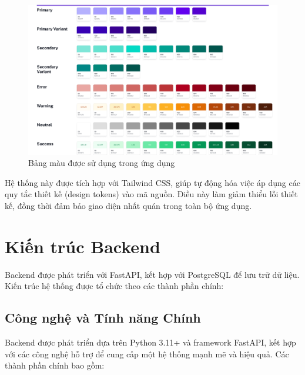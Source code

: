 \begin{figure}[H]
    \centering
    \includegraphics[scale=0.15]{Images/Implement/Colors.jpg}
    \caption{Bảng màu được sử dụng trong ứng dụng}
\end{figure}

Hệ thống này được tích hợp với Tailwind CSS, giúp tự động hóa việc áp dụng các quy tắc thiết kế (design tokens) vào mã nguồn. Điều này làm giảm thiểu lỗi thiết kế, đồng thời đảm bảo giao diện nhất quán trong toàn bộ ứng dụng.

\section{Kiến trúc Backend}

Backend được phát triển với FastAPI, kết hợp với PostgreSQL để lưu trữ dữ liệu. Kiến trúc hệ thống được tổ chức theo các thành phần chính:
\subsection*{Công nghệ và Tính năng Chính}

Backend được phát triển dựa trên Python 3.11+ và framework FastAPI, kết hợp với các công nghệ hỗ trợ để cung cấp một hệ thống mạnh mẽ và hiệu quả. Các thành phần chính bao gồm:

